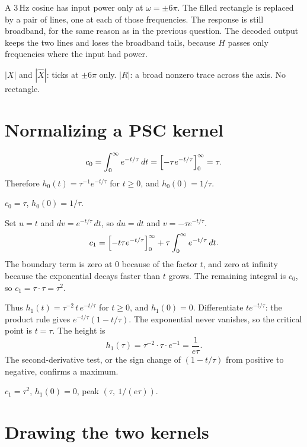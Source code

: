 \documentclass[11pt,letterpaper]{article}
\newcommand{\ans}[1]{\par\vspace{2pt}{\bfseries #1}\quad}
\begin{document}
\ans{2.}
A $3\,\mathrm{Hz}$ cosine has input power only at $\omega = \pm 6\pi$. The filled rectangle is replaced by a pair of lines, one at each of those frequencies. The response is still broadband, for the same reason as in the previous question. The decoded output keeps the two lines and loses the broadband tails, because $H$ passes only frequencies where the input had power.
\begin{sketch}
$|X|$ and $|\hat{X}|$: ticks at $\pm 6\pi$ only. $|R|$: a broad nonzero trace across the axis. No rectangle.
\end{sketch}

\section{Normalizing a PSC kernel}

\ans{1.}
\[
c_0 = \int_0^{\infty} e^{-t/\tau}\,dt = \Bigl[-\tau e^{-t/\tau}\Bigr]_0^{\infty} = \tau.
\]
Therefore $h_0(t) = \tau^{-1} e^{-t/\tau}$ for $t \ge 0$, and $h_0(0) = 1/\tau$.
\begin{result}
$c_0 = \tau$, $h_0(0) = 1/\tau$.
\end{result}

\ans{2.}
Set $u = t$ and $dv = e^{-t/\tau}\,dt$, so $du = dt$ and $v = -\tau e^{-t/\tau}$.
\[
c_1 = \Bigl[-t\tau e^{-t/\tau}\Bigr]_0^{\infty} + \tau\int_0^{\infty} e^{-t/\tau}\,dt.
\]
The boundary term is zero at $0$ because of the factor $t$, and zero at infinity because the exponential decays faster than $t$ grows. The remaining integral is $c_0$, so $c_1 = \tau\cdot\tau = \tau^2$.

Thus $h_1(t) = \tau^{-2}\, t\, e^{-t/\tau}$ for $t \ge 0$, and $h_1(0) = 0$. Differentiate $t e^{-t/\tau}$: the product rule gives $e^{-t/\tau}(1 - t/\tau)$. The exponential never vanishes, so the critical point is $t = \tau$. The height is
\[
h_1(\tau) = \tau^{-2}\cdot\tau\cdot e^{-1} = \frac{1}{e\tau}.
\]
The second-derivative test, or the sign change of $(1 - t/\tau)$ from positive to negative, confirms a maximum.
\begin{result}
$c_1 = \tau^2$, $h_1(0) = 0$, peak $(\tau,\ 1/(e\tau))$.
\end{result}

\section{Drawing the two kernels}
\end{document}
